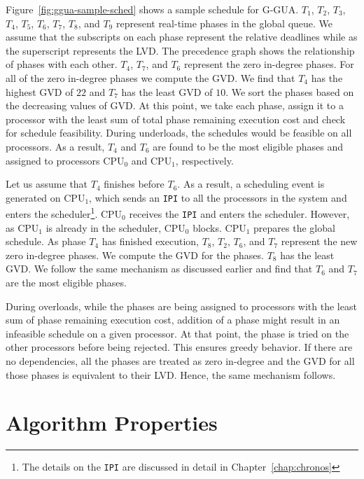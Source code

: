 \documentclass[12pt,dvips]{report}
\begin{document}
Figure~\ref{fig:ggua-sample-sched} shows a sample schedule for 	G-GUA. $T_1$, $T_2$, $T_3$, $T_4$, $T_5$, $T_6$, $T_7$, $T_8$, and $T_9$ represent real-time phases in the global queue. We assume that the subscripts on each phase represent the relative deadlines while as the superscript represents the LVD. The precedence graph shows the relationship of phases with each other. $T_4$, $T_7$, and $T_6$ represent the zero in-degree phases. For all of the zero in-degree phases we compute the GVD. We find that $T_4$ has the highest GVD of $22$ and $T_7$ has the least GVD of $10$. We sort the phases based on the decreasing values of GVD. At this point, we take each phase, assign it to a processor with the least sum of total phase remaining execution cost and check for schedule feasibility. During underloads, the schedules would be feasible on all processors. As a result, $T_4$ and $T_6$ are found to be the most eligible phases and assigned to processors CPU$_0$ and CPU$_1$, respectively. 

Let us assume that $T_4$ finishes before $T_6$. As a result, a scheduling event is generated on CPU$_1$, which sends an \texttt{IPI} to all the processors in the system and enters the scheduler\footnote{The details on the \texttt{IPI} are discussed in detail in Chapter~\ref{chap:chronos}}. CPU$_0$ receives the \texttt{IPI} and enters the scheduler. However, as CPU$_1$ is already in the scheduler, CPU$_0$ blocks. CPU$_1$ prepares the global schedule. As phase $T_4$ has finished execution, $T_8$, $T_2$, $T_6$, and $T_7$ represent the new zero in-degree phases. We compute the GVD for the phases. $T_8$ has the least GVD. We follow the same mechanism as discussed earlier and find that $T_6$ and $T_7$ are the most eligible phases. 

During overloads, while the phases are being assigned to processors with the least sum of phase remaining execution cost, addition of a phase might result in an infeasible schedule on a given processor. At that point, the phase is tried on the other processors before being rejected. This ensures greedy behavior. If there are no dependencies, all the phases are treated as zero in-degree and the GVD for all those phases is equivalent to their LVD. Hence, the same mechanism follows.


\section{Algorithm Properties}\label{sec:algorithm-properties}
\end{document}
